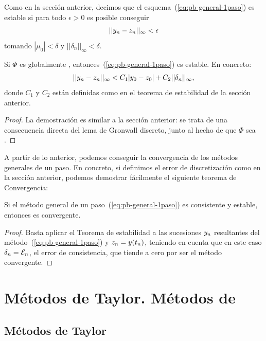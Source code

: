 Como en la sección anterior, decimos que el esquema~(\ref{eq:pb-general-1paso})
es estable si para todo $\epsilon>0$ es posible conseguir
$$
||{y_n} - z_n||_\infty < \epsilon
$$
tomando $|\mu_0|<\delta$ y $||\delta_n||_\infty<\delta$.

\begin{theorem}
  Si $\Phi$ es globalmente \lipschitz,
  entonces~(\ref{eq:pb-general-1paso}) es estable. En concreto:
  $$
  ||{y_n} - z_n||_\infty < C_1|y_0-z_0| + C_2 ||\delta_n||_\infty,
  $$
  donde $C_1$ y $C_2$ están definidas como en el teorema de
  estabilidad de la sección anterior.
\end{theorem}
\begin{proof}
  La demostración es similar a la sección anterior: se trata de una
  consecuencia directa del lema de Gronwall discreto, junto al hecho
  de que $\Phi$ sea \lipschitz.
\end{proof}
A partir de lo anterior, podemos conseguir la convergencia de los
métodos generales de un paso. En concreto, si definimos el error de
discretización como en la sección anterior, podemos demostrar
fácilmente el siguiente teorema de Convergencia:

\begin{theorem}
  Si el método general de un paso~(\ref{eq:pb-general-1paso}) es
  consistente y estable, entonces es convergente.
\end{theorem}

\begin{proof}
  Basta aplicar el Teorema de estabilidad a las sucesiones ${y_n}$
  resultantes del método~(\ref{eq:pb-general-1paso}) y $z_n=y({t_n})$,
  teniendo en cuenta que en este caso $\delta_n={\cal E}_n$, el error
  de consistencia, que tiende a cero por ser el método convergente.
\end{proof}

\section{Métodos de Taylor. Métodos de \RK}

\subsection{Métodos de Taylor}
\label{sec:metodos-de-taylor}

